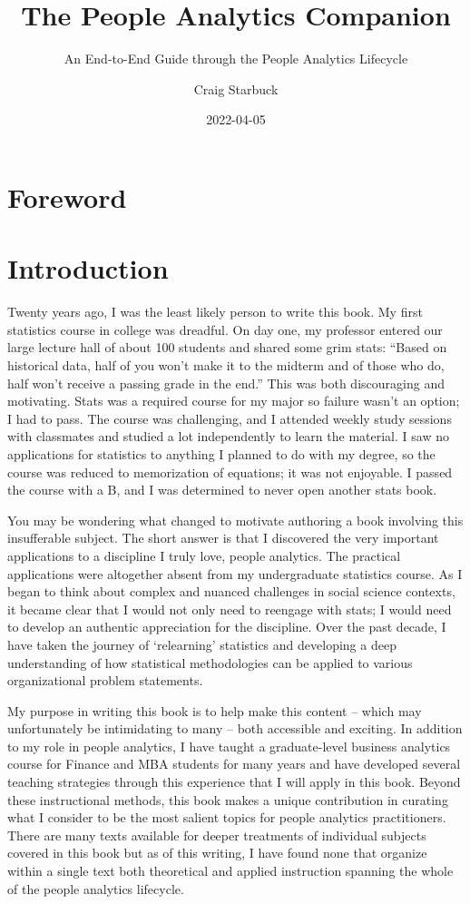 \documentclass[]{book}
\title{The People Analytics Companion}
\subtitle{An End-to-End Guide through the People Analytics Lifecycle}
\author{Craig Starbuck}
\date{2022-04-05}
\begin{document}
\maketitle

{
\setcounter{tocdepth}{1}
\tableofcontents
}
\hypertarget{foreword}{%
\chapter{Foreword}\label{foreword}}

\hypertarget{intro}{%
\chapter{Introduction}\label{intro}}

Twenty years ago, I was the least likely person to write this book. My first statistics course in college was dreadful. On day one, my professor entered our large lecture hall of about 100 students and shared some grim stats: ``Based on historical data, half of you won't make it to the midterm and of those who do, half won't receive a passing grade in the end.'' This was both discouraging and motivating. Stats was a required course for my major so failure wasn't an option; I had to pass. The course was challenging, and I attended weekly study sessions with classmates and studied a lot independently to learn the material. I saw no applications for statistics to anything I planned to do with my degree, so the course was reduced to memorization of equations; it was not enjoyable. I passed the course with a B, and I was determined to never open another stats book.

You may be wondering what changed to motivate authoring a book involving this insufferable subject. The short answer is that I discovered the very important applications to a discipline I truly love, people analytics. The practical applications were altogether absent from my undergraduate statistics course. As I began to think about complex and nuanced challenges in social science contexts, it became clear that I would not only need to reengage with stats; I would need to develop an authentic appreciation for the discipline. Over the past decade, I have taken the journey of `relearning' statistics and developing a deep understanding of how statistical methodologies can be applied to various organizational problem statements.

My purpose in writing this book is to help make this content -- which may unfortunately be intimidating to many -- both accessible and exciting. In addition to my role in people analytics, I have taught a graduate-level business analytics course for Finance and MBA students for many years and have developed several teaching strategies through this experience that I will apply in this book. Beyond these instructional methods, this book makes a unique contribution in curating what I consider to be the most salient topics for people analytics practitioners. There are many texts available for deeper treatments of individual subjects covered in this book but as of this writing, I have found none that organize within a single text both theoretical and applied instruction spanning the whole of the people analytics lifecycle.
\end{document}
